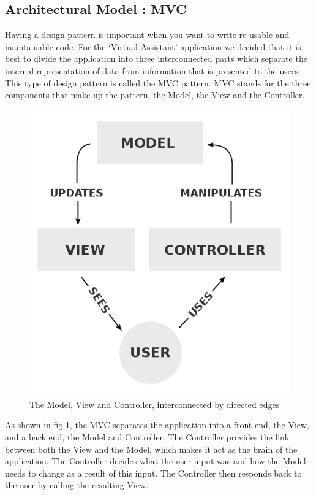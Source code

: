 \subsection{Architectural Model : MVC}
Having a design pattern is important when you want to write re-usable and maintainable code.
For the `Virtual Assistant' application we decided that it is best to divide the application into three interconnected parts which separate the internal representation of data from information that is presented to the users\cite{wiki:mvc}. This type of design pattern is called the MVC pattern. MVC stands for the three components that make up the pattern, the Model, the View and the Controller.
\begin{figure}[h]
\centering
\includegraphics[scale=0.3]{./img/MVC.png}
\caption{\small{The Model, View and Controller, interconnected by directed edges}}
\label{mvc}
	
\end{figure}

As shown in fig \ref{mvc}, the MVC separates the application into a front end, the View, and a back end, the Model and Controller. The Controller provides the link between both the View and the Model, which makes it act as the brain of the application. The Controller decides what the user input was and how the Model needs to change as a result of this input\cite{codinghorror}. The Controller then responds back to the user by calling the resulting View.

